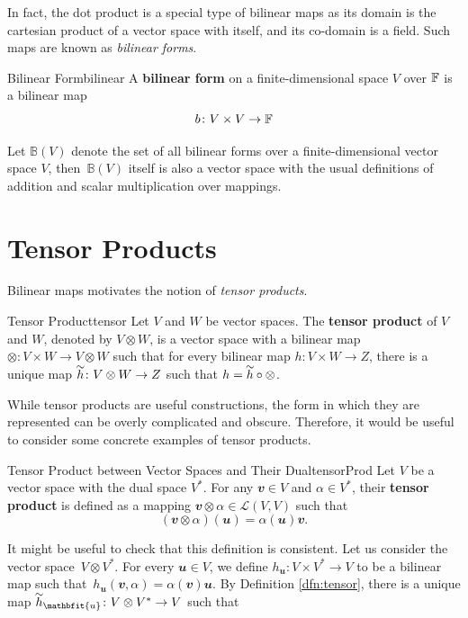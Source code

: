 \documentclass[math]{amznotes}
\renewcommand\widetilde[1]{\ThisStyle{%
  \setbox0=\hbox{$\SavedStyle#1$}%
  \stackengine{1pt-\LMpt}{$\SavedStyle#1$}{%
    \stretchto{\scaleto{\SavedStyle\mkern.2mu\sim}{.5467\wd0}}{.5\ht0}%
  }{O}{c}{F}{T}{S}%
}}
\theoremstyle{remark}
\begin{document}
In fact, the dot product is a special type of bilinear maps as its domain is the cartesian product of a vector space with itself, and its co-domain is a field. Such maps are known as \textit{bilinear forms}.
\begin{dfnbox}{Bilinear Form}{bilinear}
    A {\color{red} \textbf{bilinear form}} on a finite-dimensional space $V$ over $\mathbb{F}$ is a bilinear map 
    \begin{equation*}
        b \colon V \times V \to \mathbb{F}
    \end{equation*}   
\end{dfnbox}
Let $\mathbb{B}(V)$ denote the set of all bilinear forms over a finite-dimensional vector space $V$, then~$\mathbb{B}(V)$ itself is also a vector space with the usual definitions of addition and scalar multiplication over mappings. 
\section{Tensor Products}
Bilinear maps motivates the notion of \textit{tensor products}.
\begin{dfnbox}{Tensor Product}{tensor}
    Let $V$ and $W$ be vector spaces. The {\color{red} \textbf{tensor product}} of $V$ and $W$, denoted by $V \otimes W$, is a vector space with a bilinear map $\otimes \colon V \times W \to V \otimes W$ such that for every bilinear map $h \colon V \times W \to Z$, there is a unique map $\widetilde{h} \colon V \otimes W \to Z$ such that $h = \widetilde{h} \circ \otimes$.
\end{dfnbox}
While tensor products are useful constructions, the form in which they are represented can be overly complicated and obscure. Therefore, it would be useful to consider some concrete examples of tensor products.
\begin{dfnbox}{Tensor Product between Vector Spaces and Their Dual}{tensorProd}
    Let $V$ be a vector space with the dual space $V^*$. For any $\mathbfit{v} \in V$ and $\alpha \in V^*$, their {\color{red} \textbf{tensor product}} is defined as a mapping $\mathbfit{v} \otimes \alpha \in \mathcal{L}(V, V)$ such that
    \begin{equation*}
        (\mathbfit{v} \otimes \alpha)(\mathbfit{u}) = \alpha(\mathbfit{u})\mathbfit{v}.
    \end{equation*}
\end{dfnbox}
It might be useful to check that this definition is consistent. Let us consider the vector space~$V \otimes V^*$. For every $\mathbfit{u} \in V$, we define $h_{\mathbfit{u}} \colon V \times V^* \to V$ to be a bilinear map such that~$h_{\mathbfit{u}}(\mathbfit{v}, \alpha) = \alpha(\mathbfit{v})\mathbfit{u}$. By Definition \ref{dfn:tensor}, there is a unique map $\widetilde{h}_{\mathbfit{u}} \colon V \otimes V^* \to V$ such that 
\end{document}
